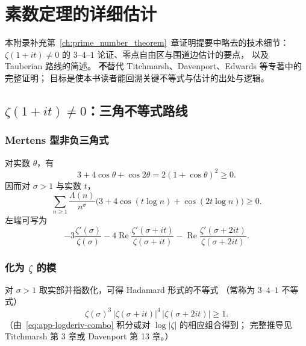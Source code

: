 
\chapter{素数定理的详细估计}
\label{app:pnt_estimates}

本附录补充第~\ref{ch:prime_number_theorem}~章证明提要中略去的技术细节：
$\zeta(1+it)\neq 0$ 的 $3$--$4$--$1$ 论证、零点自由区与围道边估计的要点，
以及 Tauberian 路线的简述。
\textbf{不}替代 Titchmarsh、Davenport、Edwards 等专著中的完整证明；
目标是使本书读者能回溯关键不等式与估计的出处与逻辑。

\section{\texorpdfstring{$\zeta(1+it)\neq 0$}{zeta(1+it)≠0}：三角不等式路线}
\label{sec:app-no-zero-Re1}

\subsection{Mertens 型非负三角式}
对实数 $\theta$，有
\begin{equation}
  3+4\cos\theta+\cos 2\theta
  =2(1+\cos\theta)^{2}
  \ge 0.
  \label{eq:app-trig}
\end{equation}
因而对 $\sigma>1$ 与实数 $t$，
\begin{equation}
  \sum_{n\ge 1}
  \frac{\Lambda(n)}{n^{\sigma}}
  \bigl(3+4\cos(t\log n)+\cos(2t\log n)\bigr)
  \ge 0.
  \label{eq:app-mertens-sum}
\end{equation}
左端可写为
\begin{equation}
  -3\frac{\zeta'(\sigma)}{\zeta(\sigma)}
  -4\operatorname{Re}\frac{\zeta'(\sigma+it)}{\zeta(\sigma+it)}
  -\operatorname{Re}\frac{\zeta'(\sigma+2it)}{\zeta(\sigma+2it)}.
  \label{eq:app-logderiv-combo}
\end{equation}

\subsection{化为 \texorpdfstring{$\zeta$}{zeta} 的模}
对 $\sigma>1$ 取实部并指数化，可得 Hadamard 形式的不等式
（常称为 $3$--$4$--$1$ 不等式）
\begin{equation}
  \zeta(\sigma)^{3}\,
  \bigl|\zeta(\sigma+it)\bigr|^{4}\,
  \bigl|\zeta(\sigma+2it)\bigr|
  \ge 1.
  \label{eq:app-341}
\end{equation}
（由~\eqref{eq:app-logderiv-combo} 积分或对 $\log|\zeta|$ 的相应组合得到；
完整推导见 Titchmarsh 第 3 章或 Davenport 第 13 章。）

